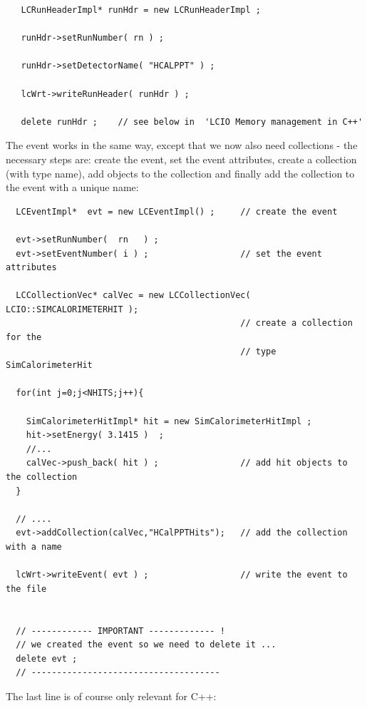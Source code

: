 \documentclass[twoside]{article}
\begin{document}
\begin{verbatim}
   LCRunHeaderImpl* runHdr = new LCRunHeaderImpl ; 

   runHdr->setRunNumber( rn ) ;
   
   runHdr->setDetectorName( "HCALPPT" ) ;
   
   lcWrt->writeRunHeader( runHdr ) ;

   delete runHdr ;    // see below in  'LCIO Memory management in C++'
\end{verbatim}

The event works in the same way, except that we now also need collections - the necessary steps are:
create the event, set the event attributes, create a collection (with type name), add objects to the 
collection and finally add the collection to the event with a unique name:

\begin{verbatim}
  LCEventImpl*  evt = new LCEventImpl() ;     // create the event 

  evt->setRunNumber(  rn   ) ;
  evt->setEventNumber( i ) ;                  // set the event attributes

  LCCollectionVec* calVec = new LCCollectionVec( LCIO::SIMCALORIMETERHIT );   
                                              // create a collection for the 
                                              // type SimCalorimeterHit

  for(int j=0;j<NHITS;j++){
  
    SimCalorimeterHitImpl* hit = new SimCalorimeterHitImpl ;
    hit->setEnergy( 3.1415 )  ;
    //...  
    calVec->push_back( hit ) ;                // add hit objects to the collection
  }

  // ....
  evt->addCollection(calVec,"HCalPPTHits");   // add the collection with a name

  lcWrt->writeEvent( evt ) ;                  // write the event to the file


  // ------------ IMPORTANT ------------- ! 
  // we created the event so we need to delete it ...
  delete evt ;
  // -------------------------------------
\end{verbatim}

The last line is of course only relevant for C++:
\end{document}
